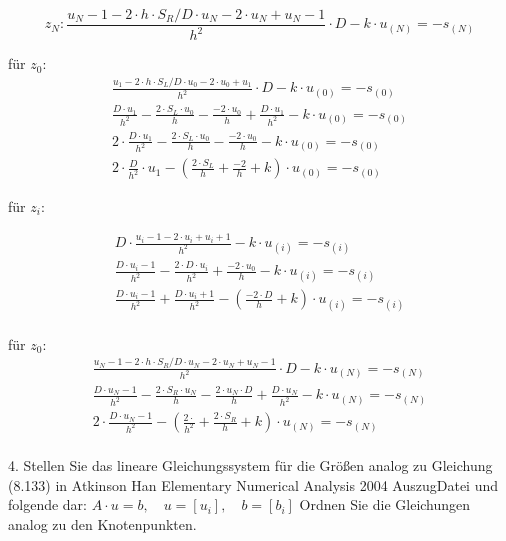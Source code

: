 \begin{equation}
	z_N: \frac{u_N-1-2\cdot h\cdot S_R/D\cdot u_N-2\cdot u_N+u_N-1}{h^2}\cdot  D-k\cdot u_(N) = -s_(N)
\end{equation}

für $z_0$:
\begin{equation}
	\begin{split}
		\frac{u_1-2\cdot h\cdot S_L/D\cdot u_0-2\cdot u_0+u_1}{h^2} \cdot D-k\cdot u_(0) = -s_(0)\\
		\frac{D\cdot u_1}{h^2}-\frac{2\cdot S_L\cdot u_0}{h}-\frac{-2\cdot u_0}{h}+\frac{D\cdot u_1}{h^2}-k\cdot u_(0) = -s_(0)\\
		2\cdot \frac{D\cdot u_1}{h^2}-\frac{2\cdot S_L\cdot u_0}{h}-\frac{-2\cdot u_0}{h}-k\cdot u_(0) = -s_(0)\\
		2\cdot \frac{D}{h^2}\cdot u_1-(\frac{2\cdot S_L}{h}+\frac{-2}{h}+k)\cdot u_(0) = -s_(0)
	\end{split}
\end{equation}


für $z_i$:

\begin{equation}
	\begin{split}
		D\cdot \frac{u_i-1-2\cdot u_i+u_i+1}{h^2}-k\cdot u_(i) = -s_(i)\\
		\frac{D\cdot u_i-1}{h^2}-\frac{2\cdot D\cdot u_i}{h^2}+\frac{-2\cdot u_0}{h}-k\cdot u_(i) = -s_(i)\\
		\frac{D\cdot u_i-1}{h^2}+\frac{D\cdot u_i+1}{h^2}-(\frac{-2\cdot D}{h}+k)\cdot u_(i) = -s_(i)\\
	\end{split}
\end{equation}




für $z_0$:
\begin{equation}
	\begin{split}
		\frac{u_N-1-2\cdot h\cdot S_R/D\cdot u_N-2\cdot u_N+u_N-1}{h^2} \cdot D-k\cdot u_(N) = -s_(N)\\
		\frac{D\cdot u_N-1}{h^2}-\frac{2\cdot S_R\cdot u_N}{h}-\frac{2\cdot u_N\cdot D}{h}+\frac{D\cdot u_N}{h^2}-k\cdot u_(N) = -s_(N)\\
		2\cdot \frac{D\cdot u_N-1}{h^2}-(\frac{2\cdot}{h^2} + \frac{2\cdot S_R}{h} + k)\cdot u_(N) = -s_(N)\\
	\end{split}
\end{equation}




4. Stellen Sie das lineare Gleichungssystem für die Größen  analog zu Gleichung (8.133) in Atkinson Han Elementary Numerical Analysis 2004 AuszugDatei und folgende dar:
$ A\cdot u = b,\quad u = [u_i],\quad b = [b_i]$
Ordnen Sie die Gleichungen analog zu den Knotenpunkten.

